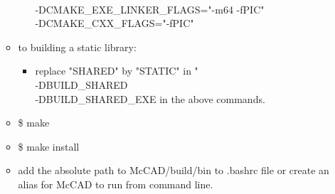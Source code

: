 \documentclass[12pt, a4paper, titlepage]{article}
\begin{document}
\begin{itemize}
\begin{itemize}
\begin{itemize}
			\\-DCMAKE\_EXE\_LINKER\_FLAGS="-m64 -fPIC" \\ -DCMAKE\_CXX\_FLAGS="-fPIC"
		  \end{itemize}
		\item to building a static library:
		\begin{itemize}
			\item replace "SHARED" by "STATIC" in "\\-DBUILD\_SHARED \\-DBUILD\_SHARED\_EXE in the above commands.
		\end{itemize}
		\item \$ make
		\item \$ make install
		\item add the absolute path to McCAD/build/bin to .bashrc file or create an alias for McCAD to run from command line.
	  \end{itemize}
    \end{itemize}
\end{document}
